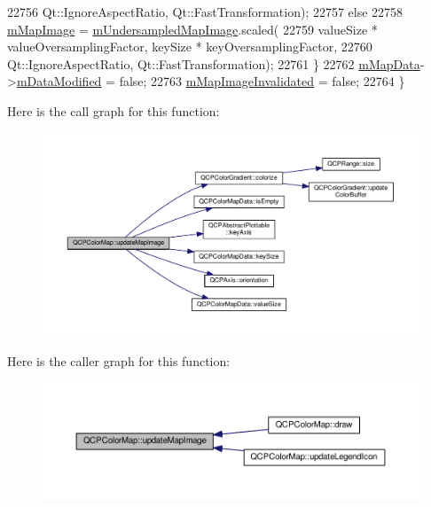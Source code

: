 \begin{DoxyCode}
22756           Qt::IgnoreAspectRatio, Qt::FastTransformation);
22757     \textcolor{keywordflow}{else}
22758       \hyperlink{class_q_c_p_color_map_a66110813b42eca78b64095b2a1f285a0}{mMapImage} = \hyperlink{class_q_c_p_color_map_acad3d52f3572436d5f2e4057911ea8d3}{mUndersampledMapImage}.scaled(
22759           valueSize * valueOversamplingFactor, keySize * keyOversamplingFactor,
22760           Qt::IgnoreAspectRatio, Qt::FastTransformation);
22761   \}
22762   \hyperlink{class_q_c_p_color_map_a8709272aa8f0be3ca111bf3866806f8b}{mMapData}->\hyperlink{class_q_c_p_color_map_data_ad3cc682da2ac14e5acdbc05cf4d3d93b}{mDataModified} = \textcolor{keyword}{false};
22763   \hyperlink{class_q_c_p_color_map_ac9aea6a5c193d7fa866bc7b26e79ef2c}{mMapImageInvalidated} = \textcolor{keyword}{false};
22764 \}
\end{DoxyCode}


Here is the call graph for this function\+:\nopagebreak
\begin{figure}[H]
\begin{center}
\leavevmode
\includegraphics[width=350pt]{class_q_c_p_color_map_a5efcea591bb5486d968af520a4d43c3a_cgraph}
\end{center}
\end{figure}




Here is the caller graph for this function\+:\nopagebreak
\begin{figure}[H]
\begin{center}
\leavevmode
\includegraphics[width=350pt]{class_q_c_p_color_map_a5efcea591bb5486d968af520a4d43c3a_icgraph}
\end{center}
\end{figure}




